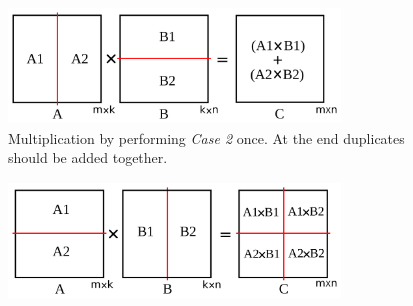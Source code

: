 \begin{figure}[thb]
    \includegraphics[width=8.8cm,height=3.1cm]{./figures/skinny001.pdf}
    \caption{Multiplication by performing \textit{Case 2} once. At the end duplicates should be added together.}
    \label{fig:skinny1}
\end{figure}

\begin{figure}[thb]
    \includegraphics[width=8.8cm,height=3.1cm]{./figures/skinny002.pdf}
    \caption{}
    \label{fig:skinny2}
\end{figure}

\fi



